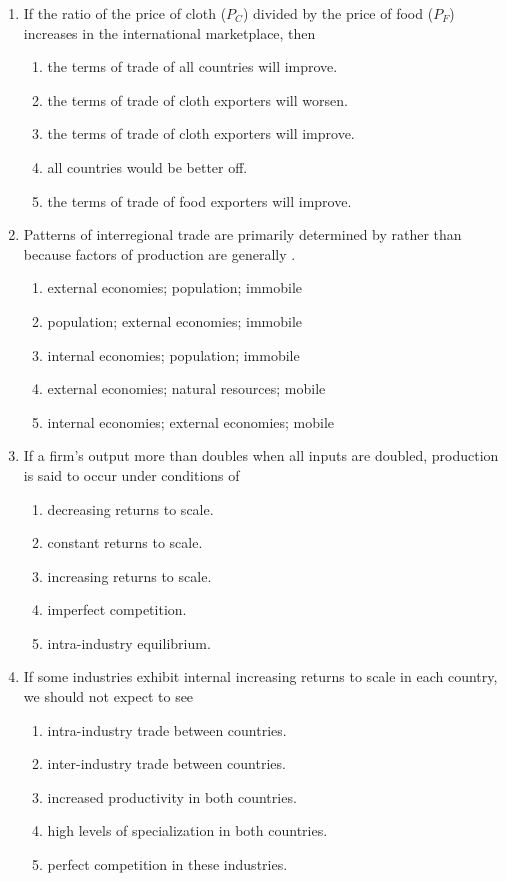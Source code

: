 \documentclass[12pt]{article}
\begin{document}
\begin{enumerate}[label=\textbf{\arabic*.}]
\item If the ratio of the price of cloth ($P_C$) divided by the price of food ($P_F$) increases in the international marketplace, then
\begin{enumerate}[label=\Alph*.]
\item the terms of trade of all countries will improve.
\item the terms of trade of cloth exporters will worsen.
\item the terms of trade of cloth exporters will improve.
\item all countries would be better off.
\item the terms of trade of food exporters will improve.
\end{enumerate}

\newpage
\item Patterns of interregional trade are primarily determined by \underline{\hspace{2em}} rather than \underline{\hspace{2em}} because factors of production are generally \underline{\hspace{2em}}.
\begin{enumerate}[label=\Alph*.]
\item external economies; population; immobile
\item population; external economies; immobile
\item internal economies; population; immobile
\item external economies; natural resources; mobile
\item internal economies; external economies; mobile
\end{enumerate}

\item If a firm's output more than doubles when all inputs are doubled, production is said to occur under conditions of
\begin{enumerate}[label=\Alph*.]
\item decreasing returns to scale.
\item constant returns to scale.
\item increasing returns to scale.
\item imperfect competition.
\item intra-industry equilibrium.
\end{enumerate}

\item If some industries exhibit internal increasing returns to scale in each country, we should not expect to see
\begin{enumerate}[label=\Alph*.]
\item intra-industry trade between countries.
\item inter-industry trade between countries.
\item increased productivity in both countries.
\item high levels of specialization in both countries.
\item perfect competition in these industries.
\end{enumerate}


\end{enumerate}
\end{document}
